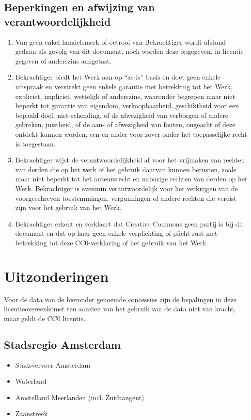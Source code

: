 \documentclass[10pt, a4paper]{article}
\begin{document}
\subsection{Beperkingen en afwijzing van verantwoordelijkheid}
\begin{enumerate}
\item Van geen enkel handelsmerk of octrooi van Bekrachtiger wordt afstand gedaan als gevolg van dit document, noch worden deze opgegeven, in licentie gegeven of anderszins aangetast.
\item Bekrachtiger biedt het Werk aan op ``as-is'' basis en doet geen enkele uitspraak en verstrekt geen enkele garantie met betrekking tot het Werk, expliciet, impliciet, wettelijk of anderszins, waaronder begrepen maar niet beperkt tot garantie van eigendom, verkoopbaarheid, geschiktheid voor een bepaald doel, niet-schending, of de afwezigheid van verborgen of andere gebreken, juistheid, of de aan- of afwezigheid van fouten, ongeacht of deze ontdekt kunnen worden, een en ander voor zover onder het toepasselijke recht is toegestaan.
\item Bekrachtiger wijst de verantwoordelijkheid af voor het vrijmaken van rechten van derden die op het werk of het gebruik daarvan kunnen berusten, zoals maar niet beperkt tot het auteursrecht en naburige rechten van derden op het Werk. Bekrachtiger is evenmin verantwoordelijk voor het verkrijgen van de voorgeschreven toestemmingen, vergunningen of andere rechten die vereist zijn voor het gebruik van het Werk.
\item Bekrachtiger erkent en verklaart dat Creative Commons geen partij is bij dit document en dat op haar geen enkele verplichting of plicht rust met betrekking tot deze CC0-verklaring of het gebruik van het Werk.
\end{enumerate}

\section{Uitzonderingen}
Voor de data van de hieronder genoemde concessies zijn de bepalingen in deze licentieovereenkomst ten aanzien van het gebruik van de data niet van kracht, maar geldt de CC0 licentie.

\subsection*{Stadsregio Amsterdam}
\begin{itemize}
\item Stadsvervoer Amsterdam
\item Waterland
\item Amstelland Meerlanden (incl. Zuidtangent)
\item Zaanstreek
\end{itemize}
\end{document}
